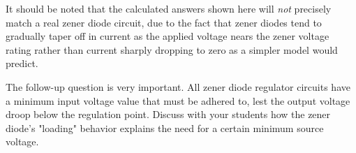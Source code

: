 It should be noted that the calculated answers shown here will {\it not} precisely match a real zener diode circuit, due to the fact that zener diodes tend to gradually taper off in current as the applied voltage nears the zener voltage rating rather than current sharply dropping to zero as a simpler model would predict.

The follow-up question is very important.  All zener diode regulator circuits have a minimum input voltage value that must be adhered to, lest the output voltage droop below the regulation point.  Discuss with your students how the zener diode's "loading" behavior explains the need for a certain minimum source voltage.




